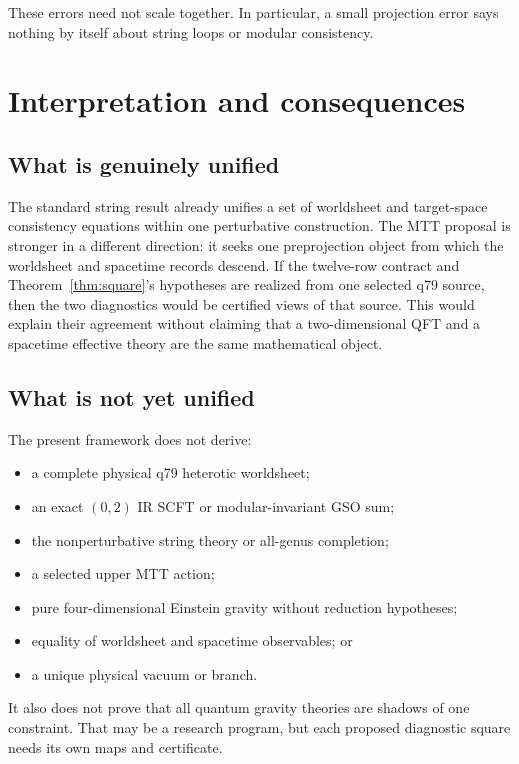 \documentclass[11pt]{article}
\begin{document}
These errors need not scale together.  In particular, a small projection
error says nothing by itself about string loops or modular consistency.

\section{Interpretation and consequences}

\subsection{What is genuinely unified}

The standard string result already unifies a set of worldsheet and
target-space consistency equations within one perturbative construction.
The MTT proposal is stronger in a different direction: it seeks one
preprojection object from which the worldsheet and spacetime records descend.
If the twelve-row contract and Theorem~\ref{thm:square}'s hypotheses are
realized from one selected q79 source, then the two diagnostics would be
certified views of that source.  This would explain their agreement without
claiming that a two-dimensional QFT and a spacetime effective theory are the
same mathematical object.

\subsection{What is not yet unified}

The present framework does not derive:
\begin{itemize}
\item a complete physical q79 heterotic worldsheet;
\item an exact \((0,2)\) IR SCFT or modular-invariant GSO sum;
\item the nonperturbative string theory or all-genus completion;
\item a selected upper MTT action;
\item pure four-dimensional Einstein gravity without reduction hypotheses;
\item equality of worldsheet and spacetime observables; or
\item a unique physical vacuum or branch.
\end{itemize}

It also does not prove that all quantum gravity theories are shadows of one
constraint.  That may be a research program, but each proposed diagnostic
square needs its own maps and certificate.
\end{document}
